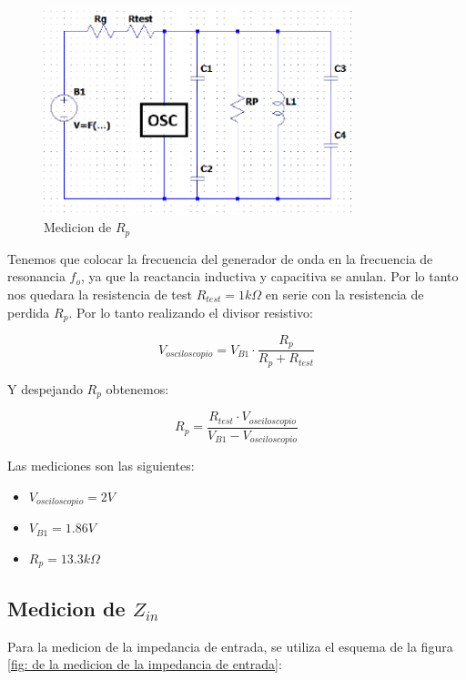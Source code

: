 \begin{figure}[h]
    \centering
    \includegraphics[width=0.8\textwidth]{Imagenes/medicion_rp.png}
    \caption{Medicion de $R_p$}
    \label{fig: de la medicion de la resistencia de perdida}
\end{figure}

Tenemos que colocar la frecuencia del generador de onda en la frecuencia de resonancia $f_o$, ya que la reactancia inductiva y capacitiva se anulan.
Por lo tanto nos quedara la resistencia de test $R_{test} = 1k\Omega$ en serie con la resistencia de perdida $R_p$. Por lo tanto realizando el divisor resistivo:

\begin{equation}
    V_{osciloscopio} = V_{B1} \cdot \frac{R_p}{R_p + R_{test}}
\end{equation}

Y despejando $R_p$ obtenemos:

\begin{equation}
    R_p = \frac{R_{test} \cdot V_{osciloscopio}}{V_{B1} - V_{osciloscopio}}
\end{equation}

Las mediciones son las siguientes:
\begin{itemize}
    \item $V_{osciloscopio} = 2 V$
    \item $V_{B1} = 1.86 V$
    \item $R_p = 13.3 k\Omega$
\end{itemize}


\subsection{Medicion de $Z_{in}$}

Para la medicion de la impedancia de entrada, se utiliza el esquema de la figura \ref{fig: de la medicion de la impedancia de entrada}:

